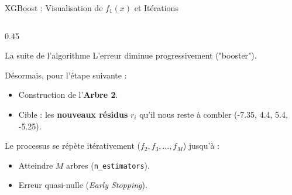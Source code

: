 \begin{frame}{XGBoost : Visualisation de $f_1(x)$ et Itérations}
\begin{columns}[T]
        \begin{column}{0.45\textwidth}
            \begin{block}{La suite de l'algorithme}
                \scriptsize
                L'erreur diminue progressivement ("booster").
                
                \vspace{0.1cm}
                Désormais, pour l'étape suivante :
                \begin{itemize}
                    \setlength\itemsep{0em}
                    \item Construction de l'\textbf{Arbre 2}.
                    \item Cible : les \textbf{nouveaux résidus} $r_i$ qu'il nous reste à combler (-7.35, 4.4, 5.4, -5.25).
                \end{itemize}
                
                \vspace{0.1cm}
                Le processus se répète itérativement ($f_2, f_3, \dots, f_M$) jusqu'à :
                \begin{itemize}
                    \setlength\itemsep{0em}
                    \item Atteindre $M$ arbres (\texttt{n\_estimators}).
                    \item Erreur quasi-nulle (\textit{Early Stopping}).
                \end{itemize}
            \end{block}
        \end{column}
    \end{columns}
\end{frame}
